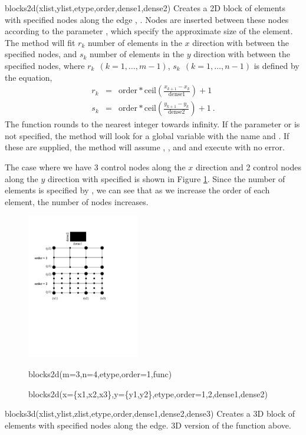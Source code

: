 \clearpage
\begin{codelist} 
 \item[blocks2d(xlist,ylist,etype,order,dense1,dense2)]
    Creates a 2D block of elements with specified nodes
    along the edge 
    ,
    .
    Nodes are inserted between these nodes according to the parameter
    , which specify the approximate size of the
    element. The method will fit $r_k$ number of elements in the $x$
    direction with  between the specified nodes, 
    and $s_k$ number of elements in the $y$
    direction with  between the specified nodes,
    where $r_k~~(k=1,\ldots,m-1)$, $s_k~~(k=1,\ldots,n-1)$ 
    is defined by the equation,
    \begin{eqnarray}
    r_k &=& \text{order} * \text{ceil}\left(\frac{x_{k+1}-x_k}
                                                 {\text{dense1}}\right)
                         + 1   \nonumber \\
    s_k &=& \text{order} * \text{ceil}\left(\frac{y_{k+1}-y_k}
                                                 {\text{dense2}}\right)
                         + 1~. \nonumber
    \end{eqnarray} 
    The function  rounds to the nearest integer towards infinity.
    If the parameter  or   is not 
    specified, the method will look for a global variable with the name 
     and . If these are supplied, the method will 
    assume , , and 
    and execute with no error.  

    The case where we have 3 control nodes along the $x$ direction and 
    2 control nodes along the $y$ direction with specified  
    is shown in Figure \ref{fig:Blocks2d}. Since the number of elements is
    specified by , we can see that as we increase the 
    order of each element, the number of nodes increases. 
    \begin{figure}[htbp]
    \centering
    \includegraphics[trim=0.0in 4.5in 2.5in 1.0in, clip, height=2.5in]{fig/blocks2d.pdf}
    \caption{blocks2d(m=3,n=4,etype,order=1,func)}
    \caption{blocks2d(x=\{x1,x2,x3\},y=\{y1,y2\},etype,order=1,2,dense1,dense2)}
    \label{fig:Blocks2d}
    \end{figure}
  \item[blocks3d(xlist,ylist,zlist,etype,order,dense1,dense2,dense3)]
    Creates a 3D block of elements with specified nodes
    along the edge. 3D version of the function above. 


\end{codelist}
